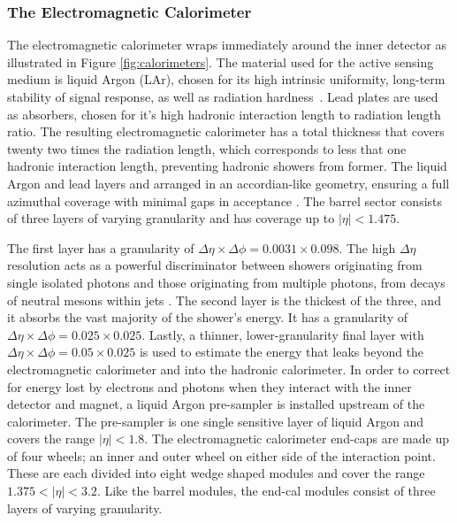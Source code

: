 \subsubsection{The Electromagnetic Calorimeter}
The electromagnetic calorimeter wraps immediately around the inner detector as illustrated in Figure \ref{fig:calorimeters}. The material used for the active sensing medium is liquid Argon (LAr), chosen for its high intrinsic uniformity, long-term stability of signal response, as well as radiation hardness~\cite{Zhang_2011}. Lead plates are used as absorbers, chosen for it's high hadronic interaction length to radiation length ratio. The resulting electromagnetic calorimeter has a total thickness that covers twenty two times the radiation length, which corresponds to less that one hadronic interaction length, preventing hadronic showers from former. The liquid Argon and lead layers and arranged in an accordian-like geometry, ensuring a full azimuthal coverage with minimal gaps in acceptance . The barrel sector consists of three layers of varying granularity and has coverage up to $|\eta| < 1.475$. 

The first layer has a granularity of $\Delta\eta\times\Delta\phi=0.0031\times 0.098$. The high $\Delta\eta$ resolution acts as a powerful discriminator between showers originating from single isolated photons and those originating from multiple photons, from decays of neutral mesons within jets . The second layer is the thickest of the three, and it absorbs the vast majority of the shower's energy. It has a granularity of $\Delta\eta\times\Delta\phi=0.025\times 0.025$. Lastly, a thinner, lower-granularity final layer with $\Delta\eta\times\Delta\phi=0.05\times 0.025$ is used to estimate the energy that leaks beyond the electromagnetic calorimeter and into the hadronic calorimeter. In order to correct for energy lost by electrons and photons when they interact with the inner detector and magnet, a liquid Argon pre-sampler is installed upstream of the calorimeter. The pre-sampler is one single sensitive layer of liquid Argon and covers the range $|\eta| < 1.8$. The electromagnetic calorimeter end-caps are made up of four wheels; an inner and outer wheel on either side of the interaction point. These are each divided into eight wedge shaped modules and cover the range $1.375 < |\eta| < 3.2$. Like the barrel modules, the end-cal modules consist of three layers of varying granularity.

